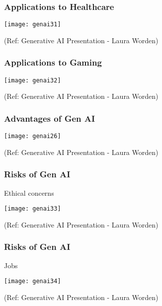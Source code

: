 \begin{frame}[fragile]\frametitle{Applications to Healthcare}

\begin{center}
\texttt{[image: genai31]}
\end{center}


{\tiny (Ref: Generative AI Presentation  - Laura Worden)}

\end{frame}

\begin{frame}[fragile]\frametitle{Applications to Gaming}

\begin{center}
\texttt{[image: genai32]}
\end{center}


{\tiny (Ref: Generative AI Presentation  - Laura Worden)}

\end{frame}



\begin{frame}[fragile]\frametitle{Advantages of Gen AI}

\begin{center}
\texttt{[image: genai26]}
\end{center}


{\tiny (Ref: Generative AI Presentation  - Laura Worden)}

\end{frame}

\begin{frame}[fragile]\frametitle{Risks of Gen AI}
Ethical concerns

\begin{center}
\texttt{[image: genai33]}
\end{center}


{\tiny (Ref: Generative AI Presentation  - Laura Worden)}

\end{frame}

\begin{frame}[fragile]\frametitle{Risks of Gen AI}
Jobs

\begin{center}
\texttt{[image: genai34]}
\end{center}


{\tiny (Ref: Generative AI Presentation  - Laura Worden)}

\end{frame}

